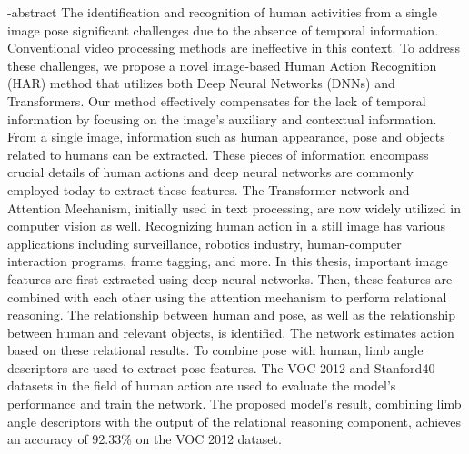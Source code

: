 
\en-abstract{
The identification and recognition of human activities from a single image pose significant challenges due to the absence of temporal information. Conventional video processing methods are ineffective in this context. To address these challenges, we propose a novel image-based Human Action Recognition (HAR) method that utilizes both Deep Neural Networks (DNNs) and Transformers. Our method effectively compensates for the lack of temporal information by focusing on the image's auxiliary and contextual information.
From a single image, information such as human appearance, pose and objects related to humans can be extracted. These pieces of information encompass crucial details of human actions and deep neural networks are commonly employed today to extract these features.
The Transformer network and Attention Mechanism, initially used in text processing, are now widely utilized in computer vision as well. Recognizing human action in a still image has various applications including surveillance, robotics industry, human-computer interaction programs, frame tagging, and more. In this thesis, important image features are first extracted using deep neural networks. Then, these features are combined with each other using the attention mechanism to perform relational reasoning. The relationship between human and pose, as well as the relationship between human and relevant objects, is identified. The network estimates action based on these relational results. To combine pose with human, limb angle descriptors are used to extract pose features. The VOC 2012 and Stanford40 datasets in the field of human action are used to evaluate the model's performance and train the network. The proposed model's result, combining limb angle descriptors with the output of the relational reasoning component, achieves an accuracy of 92.33\% on the VOC 2012 dataset.
}
